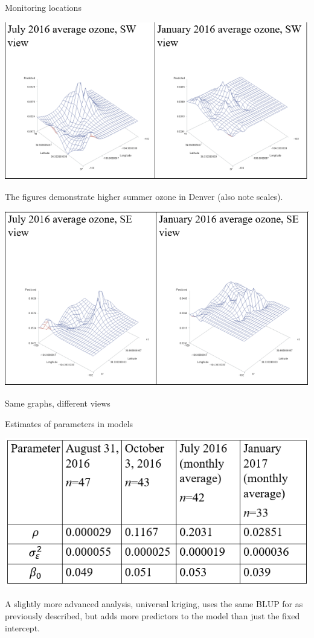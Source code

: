 \documentclass[
  9pt,
  ignorenonframetext,
]{beamer}
\begin{document}
\begin{frame}{Monitoring locations}
\protect\hypertarget{monitoring-locations}{}
\begin{center}\includegraphics[width=0.7\linewidth]{figs_L22/f6} \end{center}

The figures demonstrate higher summer ozone in Denver (also note
scales).

\begin{center}\includegraphics[width=0.7\linewidth]{figs_L22/f7} \end{center}

Same graphs, different views
\end{frame}

\begin{frame}{Estimates of parameters in models}
\protect\hypertarget{estimates-of-parameters-in-models}{}
\begin{center}\includegraphics[width=0.7\linewidth]{figs_L22/f8} \end{center}

A slightly more advanced analysis, universal kriging, uses the same BLUP
for as previously described, but adds more predictors to the model than
just the fixed intercept.
\end{frame}
\end{document}
